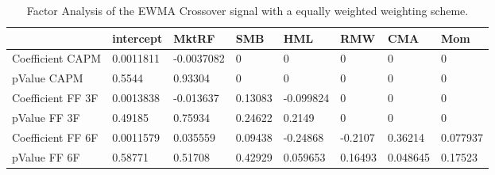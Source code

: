 \begin{table}[H]
\centering
\begin{tabular}{llllllll}
& intercept & MktRF & SMB & HML & RMW & CMA & Mom \\ 
\hline 
Coefficient CAPM & 0.0011811 & -0.0037082 & 0 & 0 & 0 & 0 & 0 \\ 
pValue CAPM & 0.5544 & 0.93304 & 0 & 0 & 0 & 0 & 0 \\ 
Coefficient FF 3F & 0.0013838 & -0.013637 & 0.13083 & -0.099824 & 0 & 0 & 0 \\ 
pValue FF 3F & 0.49185 & 0.75934 & 0.24622 & 0.2149 & 0 & 0 & 0 \\ 
Coefficient FF 6F & 0.0011579 & 0.035559 & 0.09438 & -0.24868 & -0.2107 & 0.36214 & 0.077937 \\ 
pValue FF 6F & 0.58771 & 0.51708 & 0.42929 & 0.059653 & 0.16493 & 0.048645 & 0.17523 \\ 
\hline
\end{tabular}
\caption{Factor Analysis of the EWMA Crossover signal with a equally weighted weighting scheme.}
\label{MBBSEWNR_FACTOR}
\end{table}